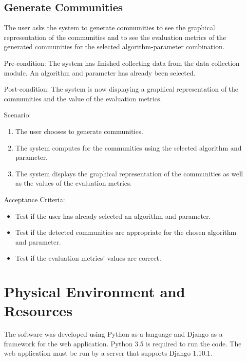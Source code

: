 \subsection{Generate Communities}

The user asks the system to generate communities to see the graphical representation of the communities and to see the 
evaluation metrics of the generated communities for the selected algorithm-parameter combination.

Pre-condition: The system has finished collecting data from the data collection module. An algorithm and parameter has
already been selected.

Post-condition: The system is now displaying a graphical representation of the communities and the value of the evaluation
metrics.

Scenario:
\begin{enumerate}
	\item The user chooses to generate communities.
	\item The system computes for the communities using the selected algorithm and parameter.
	\item The system displays the graphical representation of the communities as well as the values of the evaluation metrics.
\end{enumerate}

Acceptance Criteria:
\begin{itemize}
	\item Test if the user has already selected an algorithm and parameter.
	\item Test if the detected communities are appropriate for the chosen algorithm and parameter.
	\item Test if the evaluation metrics' values are correct.
\end{itemize}

\section{Physical Environment and Resources}
The software was developed using Python as a language and Django as a framework for the web application. Python 3.5 is required to run the code. The web application must be run by a server that supports Django 1.10.1. 